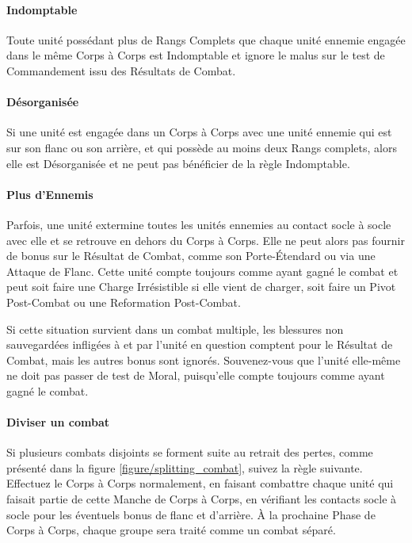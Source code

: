 \paragraph{Indomptable}

Toute unité possédant plus de Rangs Complets que chaque unité ennemie engagée dans le même Corps à Corps est Indomptable et ignore le malus sur le test de Commandement issu des Résultats de Combat.

\paragraph{Désorganisée}

Si une unité est engagée dans un Corps à Corps avec une unité ennemie qui est sur son flanc ou son arrière, et qui possède au moins deux Rangs complets, alors elle est Désorganisée et ne peut pas bénéficier de la règle Indomptable.

\paragraph{Plus d'Ennemis}

Parfois, une unité extermine toutes les unités ennemies au contact socle à socle avec elle et se retrouve en dehors du Corps à Corps. Elle ne peut alors pas fournir de bonus sur le Résultat de Combat, comme son Porte-Étendard ou via une Attaque de Flanc. Cette unité compte toujours comme ayant gagné le combat et peut soit faire une Charge Irrésistible si elle vient de charger, soit faire un Pivot Post-Combat ou une Reformation Post-Combat.

Si cette situation survient dans un combat multiple, les blessures non sauvegardées infligées à et par l'unité en question comptent pour le Résultat de Combat, mais les autres bonus sont ignorés. Souvenez-vous que l'unité elle-même ne doit pas passer de test de Moral, puisqu'elle compte toujours comme ayant gagné le combat.

\paragraph{Diviser un combat}

Si plusieurs combats disjoints se forment suite au retrait des pertes, comme présenté dans la figure \ref{figure/splitting_combat}, suivez la règle suivante. Effectuez le Corps à Corps normalement, en faisant combattre chaque unité qui faisait partie de cette Manche de Corps à Corps, en vérifiant les contacts socle à socle pour les éventuels bonus de flanc et d'arrière. À la prochaine Phase de Corps à Corps, chaque groupe sera traité comme un combat séparé.

